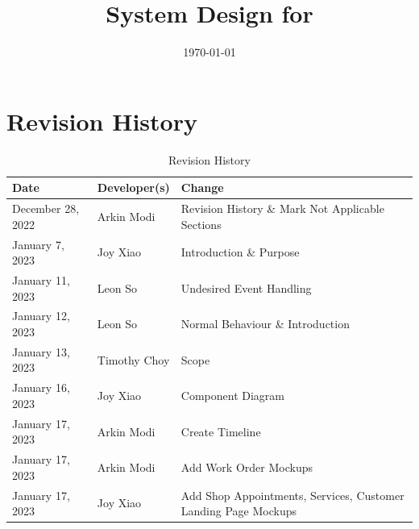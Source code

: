 \documentclass[12pt, titlepage]{article}
\begin{document}
\title{System Design for \progname{}}
\author{\authname}
\date{\today}

\maketitle


\section{Revision History}

\begin{table}[hp]
	\caption{Revision History} \label{TblRevisionHistory}
	\begin{tabularx}{\textwidth}{llX}
		\toprule
		\textbf{Date}     & \textbf{Developer(s)} & \textbf{Change}                                                                                   \\
		\midrule
		December 28, 2022 & Arkin Modi            & Revision History \& Mark Not Applicable Sections                                                  \\
		January 7, 2023   & Joy Xiao              & Introduction \& Purpose                                                                           \\
		January 11, 2023  & Leon So               & Undesired Event Handling                                                                          \\
		January 12, 2023  & Leon So               & Normal Behaviour \& Introduction                                                                  \\
		January 13, 2023  & Timothy Choy          & Scope                                                                                             \\
		January 16, 2023  & Joy Xiao              & Component Diagram                                                                                 \\
		January 17, 2023  & Arkin Modi            & Create Timeline                                                                                   \\
		January 17, 2023  & Arkin Modi            & Add Work Order Mockups                                                                            \\
		January 17, 2023  & Joy Xiao              & Add Shop Appointments, Services, Customer Landing Page Mockups                                    \\

\end{tabularx}
\end{table}
\end{document}
